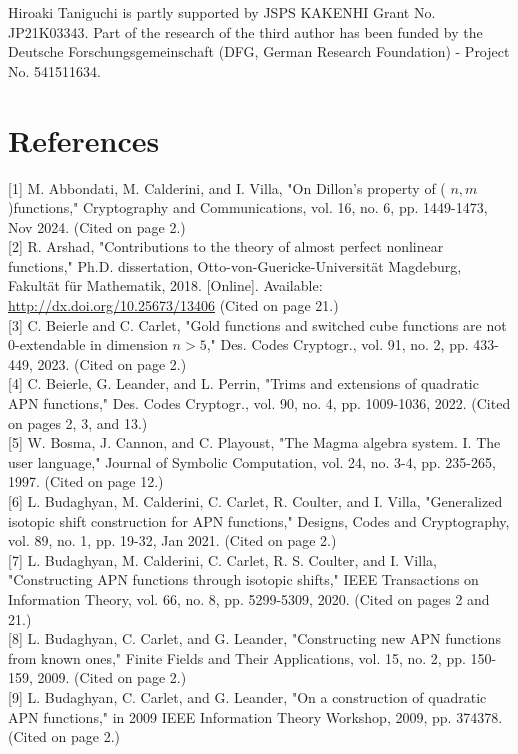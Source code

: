 \documentclass[10pt]{article}
\begin{document}
Hiroaki Taniguchi is partly supported by JSPS KAKENHI Grant No. JP21K03343. Part of the research of the third author has been funded by the Deutsche Forschungsgemeinschaft (DFG, German Research Foundation) - Project No. 541511634.

\section*{References}
[1] M. Abbondati, M. Calderini, and I. Villa, "On Dillon's property of ( $n, m$ )functions," Cryptography and Communications, vol. 16, no. 6, pp. 1449-1473, Nov 2024. (Cited on page 2.)\\[0pt]
[2] R. Arshad, "Contributions to the theory of almost perfect nonlinear functions," Ph.D. dissertation, Otto-von-Guericke-Universität Magdeburg, Fakultät für Mathematik, 2018. [Online]. Available: \href{http://dx.doi.org/10.25673/13406}{http://dx.doi.org/10.25673/13406} (Cited on page 21.)\\[0pt]
[3] C. Beierle and C. Carlet, "Gold functions and switched cube functions are not 0-extendable in dimension $n>5$," Des. Codes Cryptogr., vol. 91, no. 2, pp. 433-449, 2023. (Cited on page 2.)\\[0pt]
[4] C. Beierle, G. Leander, and L. Perrin, "Trims and extensions of quadratic APN functions," Des. Codes Cryptogr., vol. 90, no. 4, pp. 1009-1036, 2022. (Cited on pages 2, 3, and 13.)\\[0pt]
[5] W. Bosma, J. Cannon, and C. Playoust, "The Magma algebra system. I. The user language," Journal of Symbolic Computation, vol. 24, no. 3-4, pp. 235-265, 1997. (Cited on page 12.)\\[0pt]
[6] L. Budaghyan, M. Calderini, C. Carlet, R. Coulter, and I. Villa, "Generalized isotopic shift construction for APN functions," Designs, Codes and Cryptography, vol. 89, no. 1, pp. 19-32, Jan 2021. (Cited on page 2.)\\[0pt]
[7] L. Budaghyan, M. Calderini, C. Carlet, R. S. Coulter, and I. Villa, "Constructing APN functions through isotopic shifts," IEEE Transactions on Information Theory, vol. 66, no. 8, pp. 5299-5309, 2020. (Cited on pages 2 and 21.)\\[0pt]
[8] L. Budaghyan, C. Carlet, and G. Leander, "Constructing new APN functions from known ones," Finite Fields and Their Applications, vol. 15, no. 2, pp. 150-159, 2009. (Cited on page 2.)\\[0pt]
[9] L. Budaghyan, C. Carlet, and G. Leander, "On a construction of quadratic APN functions," in 2009 IEEE Information Theory Workshop, 2009, pp. 374378. (Cited on page 2.)\\[0pt]
\end{document}
